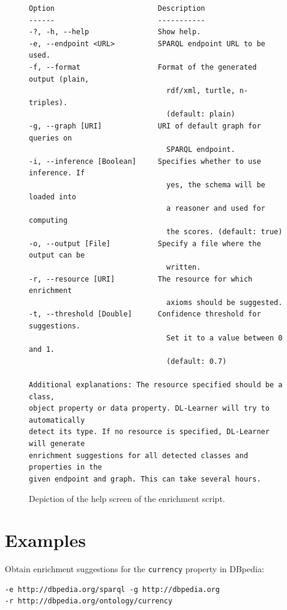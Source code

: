\documentclass[a4paper,12pt]{scrartcl}
\begin{document}
\begin{figure}[tbh]
\begin{verbatim}
Option                        Description                            
------                        -----------                            
-?, -h, --help                Show help.                             
-e, --endpoint <URL>          SPARQL endpoint URL to be used.        
-f, --format                  Format of the generated output (plain, 
                                rdf/xml, turtle, n-triples).         
                                (default: plain)                     
-g, --graph [URI]             URI of default graph for queries on    
                                SPARQL endpoint.                     
-i, --inference [Boolean]     Specifies whether to use inference. If 
                                yes, the schema will be loaded into  
                                a reasoner and used for computing    
                                the scores. (default: true)          
-o, --output [File]           Specify a file where the output can be 
                                written.                             
-r, --resource [URI]          The resource for which enrichment      
                                axioms should be suggested.          
-t, --threshold [Double]      Confidence threshold for suggestions.  
                                Set it to a value between 0 and 1.   
                                (default: 0.7)                       

Additional explanations: The resource specified should be a class, 
object property or data property. DL-Learner will try to automatically 
detect its type. If no resource is specified, DL-Learner will generate 
enrichment suggestions for all detected classes and properties in the 
given endpoint and graph. This can take several hours.
\end{verbatim}
\caption{Depiction of the help screen of the enrichment script.}
\label{fig:cli}
\end{figure}

\section*{Examples}

Obtain enrichment suggestions for the \verb|currency| property in DBpedia:
\begin{verbatim}
-e http://dbpedia.org/sparql -g http://dbpedia.org 
-r http://dbpedia.org/ontology/currency
\end{verbatim}
\end{document}
